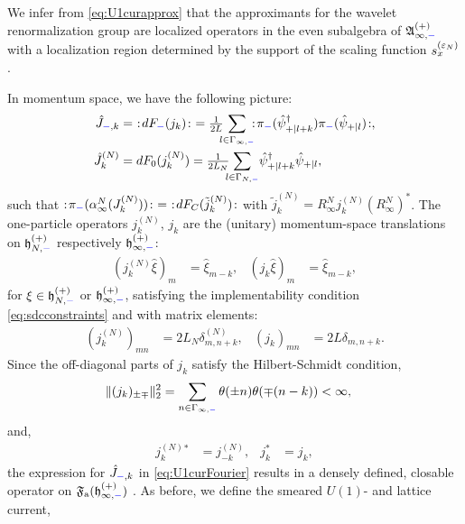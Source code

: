\documentclass[a4paper, 11pt]{article}
\newcommand{\fA}{\mathfrak{A}}\newcommand{\cA}{\mathcal{A}}\newcommand{\dA}{\mathds{A}}\newcommand{\sA}{\mathscr{A}}
\newcommand{\ua}{\textup a}
\newcommand{\fF}{\mathfrak{F}}\newcommand{\cF}{\mathcal{F}}\newcommand{\dF}{\mathds{F}}\newcommand{\sF}{\mathscr{F}}
\newcommand{\fh}{\mathfrak{h}}
\DeclareMathOperator{\1}{\mathds{1}}
\begin{document}
We infer from \eqref{eq:U1curapprox} that the approximants for the wavelet renormalization group are localized operators in the even subalgebra of $\fA^{(+)}_{\infty,{\color{blue}-}}$ with a localization region determined by the support of the scaling function $s^{(\varepsilon_{N})}_{x}$. 

\bigskip

In momentum space, we have the following picture:
\begin{align}
\label{eq:U1curFourier}
\hat{J}_{{\color{blue}-},k} & =\ :\!dF_{{\color{blue}-}}(j_{k})\!:\ = \tfrac{1}{2L}\!\!\!\sum_{l\in\Gamma_{\infty,{\color{blue}-}}}\!\!\!:\!\pi_{{\color{blue}-}}(\hat{\psi}^{\dag}_{+|l+k})\pi_{{\color{blue}-}}(\hat{\psi}_{+|l})\!:, \\ \nonumber
\hat{J}^{(N)}_{k} & = dF_{0}(j^{(N)}_{k}) = \tfrac{1}{2L_{N}}\!\!\!\sum_{l\in\Gamma_{N,{\color{blue}-}}}\!\hat{\psi}^{\dag}_{+|l+k}\hat{\psi}_{+|l},
\end{align}
such that $:\!\pi_{{\color{blue}-}}(\alpha^{N}_{\infty}(J^{(N)}_{k}))\!:\ =\ :\!dF_{C}(\tilde{j}^{(N)}_{k})\!:$ with $\tilde{j}^{(N)}_{k} = R^{N}_{\infty}j^{(N)}_{k}(R^{N}_{\infty})^{*}$.
The one-particle operators $j^{(N)}_{k}$, $j_{k}$ are the (unitary) momentum-space translations on $\fh^{(+)}_{N,{\color{blue}-}}$ respectively $\fh^{(+)}_{\infty,{\color{blue}-}}$:
\begin{align}
\label{eq:U1cur1p}
 (j^{(N)}_{k}\hat{\xi})_{m} & = \hat{\xi}_{m-k}, & (j_{k}\hat{\xi})_{m} & = \hat{\xi}_{m-k},
\end{align}
for $\xi\in\fh^{(+)}_{N,{\color{blue}-}}$ or $\fh^{(+)}_{\infty,{\color{blue}-}}$, satisfying the implementability condition \eqref{eq:sdcconstraints} and with matrix elements:
\begin{align}
\label{eq:U1cur1pmatrix}
(j^{(N)}_{k})_{mn} & = 2L_{N} \delta^{(N)}_{m,n+k}, & (j_{k})_{mn} & = 2L \delta_{m,n+k}.
\end{align}
Since the off-diagonal parts of $j_{k}$ satisfy the Hilbert-Schmidt condition,
\begin{align}
\label{eq:U1curimp}
\|(j_{k})_{\pm\mp}\|_{2}^{2} & = \sum_{n\in\Gamma_{\infty,{\color{blue}-}}}\theta(\pm n)\theta(\mp(n-k)) < \infty,
\end{align}
and,
\begin{align}
\label{eq:U1curadjoint}
j^{(N)}_{k}{}^{*} & = j^{(N)}_{-k}, & j_{k}^{*} & = j_{k},
\end{align}
the expression for $\hat{J}_{{\color{blue}-},k}$ in \eqref{eq:U1curFourier} results in a densely defined, closable operator on $\fF_{\ua}(\fh^{(+)}_{\infty,{\color{blue}-}})$ \cite{CareyOnFermionGauge, EvansQuantumSymmetriesOn}. As before, we define the smeared $U(1)$- and lattice current,
\end{document}
